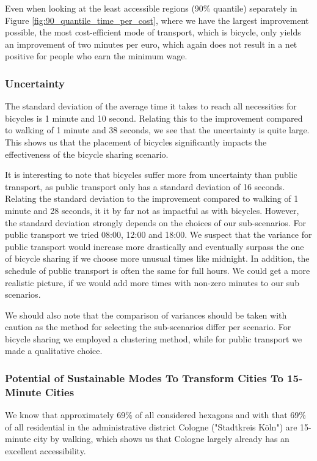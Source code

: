 Even when looking at the least accessible regions (90\% quantile) separately in Figure \ref{fig:90_quantile_time_per_cost}, where we have the largest improvement possible, the most cost-efficient mode of transport, which is bicycle, only yields an improvement of two minutes per euro, which again does not result in a net positive for people who earn the minimum wage.



\subsubsection{Uncertainty}

The standard deviation of the average time it takes to reach all necessities for bicycles is 1 minute and 10 second. 
Relating this to the improvement compared to walking of 1 minute and 38 seconds, we see that the uncertainty is quite large.
This shows us that the placement of bicycles significantly impacts the effectiveness of the bicycle sharing scenario.

It is interesting to note that bicycles suffer more from uncertainty than public transport, as public transport only has a standard deviation of 16 seconds.
Relating the standard deviation to the improvement compared to walking of 1 minute and 28 seconds, it it by far not as impactful as with bicycles.
However, the standard deviation strongly depends on the choices of our sub-scenarios. 
For public transport we tried 08:00, 12:00 and 18:00.
We suspect that the variance for public transport would increase more drastically and eventually surpass the one of bicycle sharing if we choose more unusual times like midnight.
In addition, the schedule of public transport is often the same for full hours.
We could get a more realistic picture, if we would add more times with non-zero minutes to our sub scenarios.

We should also note that the comparison of variances should be taken with caution as the method for selecting the sub-scenarios differ per scenario.
For bicycle sharing we employed a clustering method, while for public transport we made a qualitative choice. 

\subsubsection{Potential of Sustainable Modes To Transform Cities To 15-Minute Cities}

We know that approximately 69\% of all considered hexagons and with that 69\% of all residential in the administrative district Cologne ("Stadtkreis Köln") are 15-minute city by walking, which shows us that Cologne largely already has an excellent accessibility.

